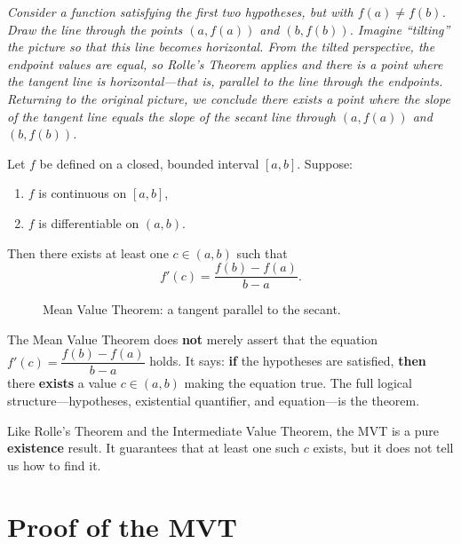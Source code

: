 \textit{Consider a function satisfying the first two hypotheses, but with $f(a) \neq f(b)$.  Draw the line through the points $(a, f(a))$ and $(b, f(b))$.  Imagine ``tilting'' the picture so that this line becomes horizontal.  From the tilted perspective, the endpoint values are equal, so Rolle's Theorem applies and there is a point where the tangent line is horizontal---that is, parallel to the line through the endpoints.  Returning to the original picture, we conclude there exists a point where the slope of the tangent line equals the slope of the secant line through $(a, f(a))$ and $(b, f(b))$.}

\begin{theorem}
\label{thm:5-5}
Let $f$ be defined on a closed, bounded interval $[a,b]$.  Suppose:
\begin{enumerate}[label=(\roman*)]
  \item $f$ is continuous on $[a,b]$,
  \item $f$ is differentiable on $(a,b)$.
\end{enumerate}
Then there exists at least one $c \in (a,b)$ such that
\[
  f'(c) = \frac{f(b) - f(a)}{b - a}.
\]
\end{theorem}

\begin{figure}[ht]
  \centering
  
  \caption{Mean Value Theorem: a tangent parallel to the secant.}
  \label{fig:mean-value-theorem}
\end{figure}

\begin{remark}[Warning]
The Mean Value Theorem does \textbf{not} merely assert that the equation $f'(c) = \dfrac{f(b) - f(a)}{b - a}$ holds.  It says: \textbf{if} the hypotheses are satisfied, \textbf{then} there \textbf{exists} a value $c \in (a,b)$ making the equation true.  The full logical structure---hypotheses, existential quantifier, and equation---is the theorem.
\end{remark}

\begin{remark}
Like Rolle's Theorem and the Intermediate Value Theorem, the MVT is a pure \textbf{existence} result.  It guarantees that at least one such $c$ exists, but it does not tell us how to find it.
\end{remark}

\section{Proof of the MVT}
\label{sec:5.8}

